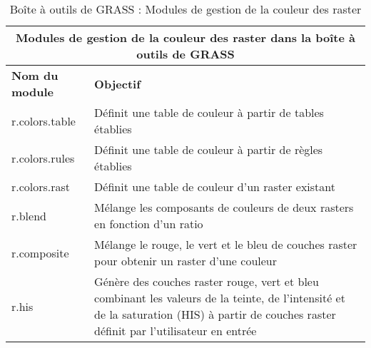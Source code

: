 \begin{table}[ht]
\centering
\caption{Bo\^ite \`a outils de GRASS : Modules de gestion de la couleur des raster}\medskip
 \begin{tabular}{|p{4cm}|p{12cm}|}
  \hline \multicolumn{2}{|c|}{\textbf{Modules de gestion de la couleur des raster dans la bo\^ite \`a outils de GRASS}} \\
  \hline \textbf{Nom du module} & \textbf{Objectif} \\
  \hline r.colors.table & D\'efinit une table de couleur \`a partir de tables \'etablies \\
  \hline r.colors.rules & D\'efinit une table de couleur \`a partir de r\`egles \'etablies \\
  \hline r.colors.rast & D\'efinit une table de couleur d'un raster existant \\
  \hline r.blend & M\'elange les composants de couleurs de deux rasters en fonction d'un ratio \\
  \hline r.composite & M\'elange le rouge, le vert et le bleu de couches raster pour obtenir un raster d'une couleur \\
  \hline r.his & G\'en\`ere des couches raster rouge, vert et bleu combinant les valeurs de la teinte, de l'intensit\'e et de la saturation (HIS) \`a partir de couches raster d\'efinit par l'utilisateur en entr\'ee \\
\hline
\end{tabular}
\end{table}

